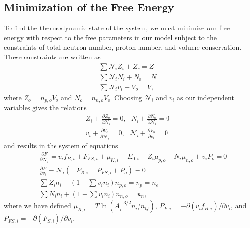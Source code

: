 \documentclass[11pt,letter]{article}
\begin{document}
\subsection{Minimization of the Free Energy}
To find the thermodynamic state of the system, we must minimize our free energy
with respect to the free parameters in our model subject to the constraints of
total neutron number, proton number, and volume conservation.  These constraints
are written as \begin{eqnarray}
\sum \mathcal{N}_i Z_i + Z_o = Z \\
\sum \mathcal{N}_i N_i + N_o = N \\
\sum \mathcal{N}_i v_i + V_o = V, 
\end{eqnarray}
where $Z_o = n_{p,o} V_o$ and $N_o = n_{n,o} V_o$.  Choosing $\mathcal{N}_i$ and
$v_i$ as our independent variables gives the relations \begin{eqnarray} 
Z_i + \frac{\partial Z_o}{\partial \mathcal{N}_i} = 0, \,\, \,\,
N_i + \frac{\partial N_o}{\partial \mathcal{N}_i} = 0 \\
v_i + \frac{\partial V_o}{\partial \mathcal{N}_i} = 0, \,\, \,\,
\mathcal{N}_i + \frac{\partial V_o}{\partial v_i} = 0
\end{eqnarray}
and results in the system of equations 
\begin{eqnarray}
\label{eq:dFdN}
&&\frac{\partial F}{\partial \mathcal{N}_i} = v_i f_{B,i} + F_{FS,i} 
+ \mu_{K,i} + E_{0,i} - Z_i \mu_{p,o} - N_i \mu_{n,o} + v_i P_o  = 0 \\
\label{eq:dFdv}
&&\frac{\partial F}{\partial v_i} = \mathcal{N}_i 
\left(- P_{B,i} - P_{FS,i} + P_{o} \right) = 0 \\ 
&&\sum Z_i n_i + \left(1-\sum v_i n_i \right) n_{p,o} = n_p = n_e \\
&&\sum N_i n_i + \left(1-\sum v_i n_i \right) n_{n,o} = n_n,
\end{eqnarray}
where we have defined $\mu_{K,i} = T \ln (A_i^{-3/2} n_i/n_Q)$, 
$P_{B,i} = -\partial (v_i f_{B,i}) / \partial v_i$, and 
$P_{FS,i} = -\partial (F_{S,i}) / \partial v_i$.
\end{document}
